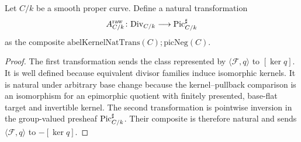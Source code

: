 \begin{definition}\leanok
  \label{def:abel_map_witness}
  Let \(C/k\) be a smooth proper curve. Define a
  natural transformation
  \[
    A^{\mathrm{raw}}_{C/k} \colon \mathrm{Div}_{C/k}
      \longrightarrow \operatorname{Pic}^\sharp_{C/k}
  \]
  as the composite
  \(
    \mathrm{abelKernelNatTrans}(C)
    \mathbin{;} \mathrm{picNeg}(C)
  \).
\end{definition}

\begin{proof}\leanok
  The first transformation sends the class represented by
  \(\langle \mathcal F,q\rangle\) to \([\ker q]\). It is well defined because
  equivalent divisor families induce isomorphic kernels. It is natural under
  arbitrary base change because the kernel--pullback comparison is an
  isomorphism for an epimorphic quotient with finitely presented, base-flat
  target and invertible kernel. The second transformation is pointwise
  inversion in the group-valued presheaf \(\operatorname{Pic}^\sharp_{C/k}\). Their composite
  is therefore natural and sends
  \(\langle \mathcal F,q\rangle\) to \(-[\ker q]\).
\end{proof}

